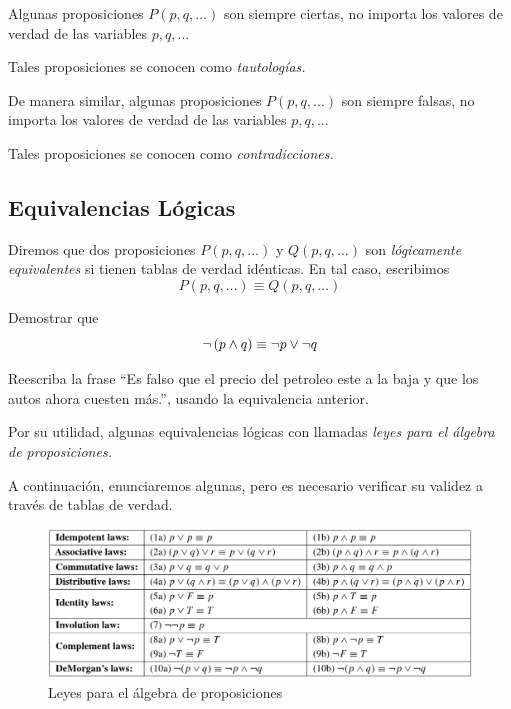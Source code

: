  Algunas proposiciones $P(p,q,...)$ son siempre ciertas, no importa los valores de verdad de las variables $p,q,...$ 
  
 
 Tales proposiciones se conocen como \emph{tautologías.}



 De manera similar, algunas proposiciones $P(p,q,...)$ son siempre falsas, no importa los valores de verdad de las variables $p,q,...$ 
  
 
 Tales proposiciones se conocen como \emph{contradicciones.}






\subsection{Equivalencias Lógicas}


 Diremos que dos proposiciones $P(p,q,...)$ y $Q(p,q,...)$ son \emph{lógicamente equivalentes} si tienen tablas de verdad idénticas. En tal caso, escribimos $$P(p,q,\dots)\equiv Q(p,q,\dots)$$



 \begin{resuelto} Demostrar que
  $$
  \neg\left( p \wedge q \right) \equiv \neg p \vee \neg q
  $$
 \end{resuelto}




 \begin{resuelto}
  Reescriba la frase ``Es falso que el precio del petroleo este a la baja y que los autos ahora cuesten más.'', usando la equivalencia anterior.
 \end{resuelto}





 Por su utilidad, algunas equivalencias lógicas con llamadas \emph{leyes para el álgebra de proposiciones.}
 
 
 A continuación, enunciaremos algunas, pero es necesario verificar su validez a través de tablas de verdad. 



\begin{figure}
	\centering
	\includegraphics[width=\linewidth]{md/tabla_4-1}
 \caption{Leyes para el álgebra de proposiciones}
\label{fig:tabla:4.1}
\end{figure}



